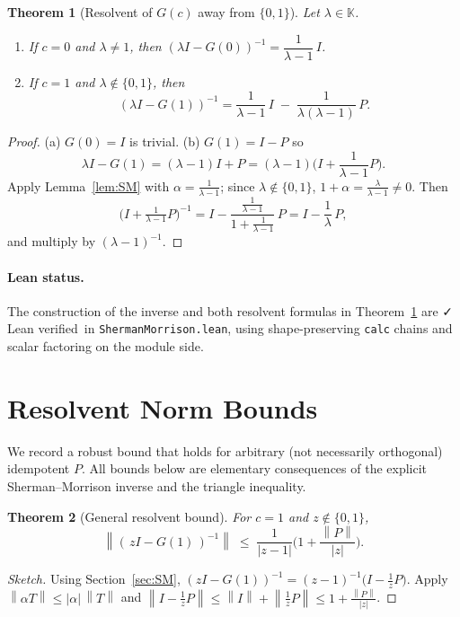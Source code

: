 \documentclass[11pt]{article}
\newtheorem{theorem}{Theorem}[section]
\theoremstyle{definition}
\newcommand{\K}{\mathbb{K}}
\newcommand{\norm}[1]{\left\lVert #1\right\rVert}
\newcommand{\leanok}{\textsf{\small \textcolor{green!60!black}{✓ Lean verified}}}
\begin{document}
\begin{theorem}[Resolvent of $G(c)$ away from $\{0,1\}$]\label{thm:SM-resolvent}
Let $\lambda\in\K$.
\begin{enumerate}
\item If $c=0$ and $\lambda\neq 1$, then $(\lambda I - G(0))^{-1}=\dfrac{1}{\lambda-1}\,I$.
\item If $c=1$ and $\lambda\notin\{0,1\}$, then
\[
(\lambda I - G(1))^{-1}
= \frac{1}{\lambda-1}\,I \;-\; \frac{1}{\lambda(\lambda-1)}\,P.
\]
\end{enumerate}
\end{theorem}

\begin{proof}
(a) $G(0)=I$ is trivial. (b) $G(1)=I-P$ so
\[
\lambda I - G(1)=(\lambda-1)I+P=(\lambda-1)\Big(I + \frac{1}{\lambda-1}P\Big).
\]
Apply Lemma~\ref{lem:SM} with $\alpha=\frac{1}{\lambda-1}$; since $\lambda\notin\{0,1\}$, $1+\alpha=\frac{\lambda}{\lambda-1}\neq 0$. Then
\[
\big(I+\tfrac{1}{\lambda-1}P\big)^{-1}
= I - \frac{\frac{1}{\lambda-1}}{1+\frac{1}{\lambda-1}}\,P
= I - \frac{1}{\lambda}\,P,
\]
and multiply by $(\lambda-1)^{-1}$.
\end{proof}

\paragraph{Lean status.} The construction of the inverse and both resolvent formulas in Theorem~\ref{thm:SM-resolvent} are \leanok\ in \texttt{ShermanMorrison.lean}, using shape-preserving \texttt{calc} chains and scalar factoring on the module side.

\section{Resolvent Norm Bounds}\label{sec:norms}

We record a robust bound that holds for arbitrary (not necessarily orthogonal) idempotent $P$.
All bounds below are elementary consequences of the explicit Sherman--Morrison inverse and the triangle inequality.

\begin{theorem}[General resolvent bound]\label{thm:bound-general}
For $c=1$ and $z\notin\{0,1\}$,
\[
\norm{(\,zI - G(1)\,)^{-1}} \;\le\; \frac{1}{|z-1|}\Big(1 + \frac{\norm{P}}{|z|}\Big).
\]
\end{theorem}

\begin{proof}[Sketch]
Using Section~\ref{sec:SM}, $(zI - G(1))^{-1}=(z-1)^{-1}\big(I - \frac{1}{z}P\big)$. Apply $\norm{\alpha T}\le |\alpha|\,\norm{T}$ and $\norm{I - \frac{1}{z}P}\le \norm{I} + \norm{\frac{1}{z}P}\le 1 + \frac{\norm{P}}{|z|}$.
\end{proof}
\end{document}
